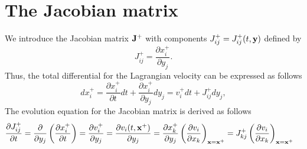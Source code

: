 \documentclass[oneside,a4paper,11pt]{report}
\begin{document}
\section{The Jacobian matrix}
We introduce the Jacobian matrix $\mathbf{J}^+$ with components $J^+_{ij} = J^+_{ij}(t,\mathbf{y})$ defined by
\begin{equation}
    \label{eq:kinematics_Jacobian_def}
    J^+_{ij} = \frac{\partial x^+_i}{\partial y_j}.
\end{equation}
Thus, the total differential for the Lagrangian velocity can be expressed as follows
\begin{equation}
dx^+_i = \frac{ \partial x^+_i}{\partial t} dt + \frac{\partial x^+_i}{\partial y_j}dy_j = v^+_i dt + J^+_{ij} dy_j,
\end{equation}
The evolution equation for the Jacobian matrix is derived as follows
\begin{align}
\label{eq:pde_of_Jacobian_matrix}
\frac{\partial J^+_{ij}}{\partial t} & = \frac{\partial}{\partial y_j} \left ( \frac{\partial x^+_i}{\partial t} \right ) = \frac{\partial v^+_i}{\partial y_j} = \frac{\partial v_i(t,\mathbf{x}^+)}{\partial y_j} = \frac{\partial x^+_{k}}{\partial y_j} \left ( \frac{ \partial v_i}{\partial x_k} \right )_{\mathbf{x} = \mathbf{x}^+} = J^+_{kj} \left ( \frac{ \partial v_i}{\partial x_k} \right )_{\mathbf{x} = \mathbf{x}^+} 
\end{align}
\end{document}
